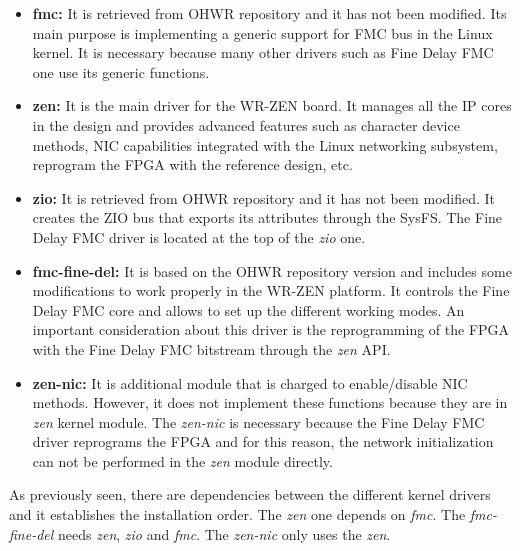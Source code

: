 \begin{itemize}
	\item {\textbf{fmc:} It is retrieved from OHWR repository and it has not been modified. Its main purpose is implementing a generic support for FMC bus in the Linux kernel. It is necessary because many other drivers such as Fine Delay FMC one use its generic functions.}
	\item {\textbf{zen:} It is the main driver for the WR-ZEN board. It manages all the IP cores in the design and provides advanced features such as character device methods, NIC capabilities integrated with the Linux networking subsystem, reprogram the FPGA with the reference design, etc.}
	\item{\textbf{zio:} It is retrieved from OHWR repository and it has not been modified. It creates the ZIO bus that exports its attributes through the SysFS. The Fine Delay FMC driver is located at the top of the \textit{zio} one.}
	\item{\textbf{fmc-fine-del:} It is based on the OHWR repository version and includes some modifications to work properly in the WR-ZEN platform. It controls the Fine Delay FMC core and allows to set up the different working modes. An important consideration about this driver is the reprogramming of the FPGA with the Fine Delay FMC bitstream through the \textit{zen} API.}
	\item {\textbf{zen-nic:} It is additional module that is charged to enable/disable NIC methods. However, it does not implement these functions because they are in \textit{zen} kernel module. The \textit{zen-nic} is necessary because the Fine Delay FMC driver reprograms the FPGA and for this reason, the network initialization can not be performed in the \textit{zen} module directly.}
\end{itemize}

As previously seen, there are dependencies between the different kernel drivers and it establishes the installation order. The \textit{zen} one depends on \textit{fmc}. The \textit{fmc-fine-del} needs \textit{zen}, \textit{zio} and \textit{fmc}. The \textit{zen-nic} only uses the \textit{zen}.


